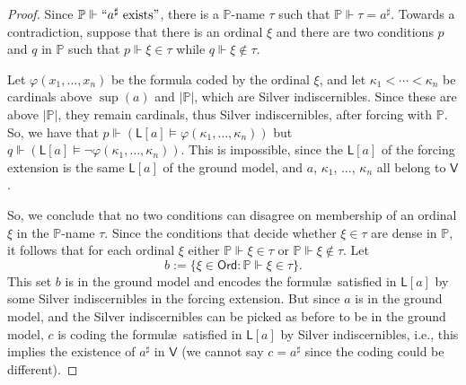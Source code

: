 \documentclass[10pt]{amsart}
\theoremstyle{definition}
\begin{document}
\begin{proof}
Since $\mathbb P\Vdash ``a^\sharp\ \text{exists}"$, there is a $\mathbb P$-name $\tau$ such that $\mathbb P\Vdash \tau=a^\sharp$. Towards a contradiction, suppose that there is an ordinal $\xi$ and there are two conditions $p$ and $q$ in $\mathbb P$ such that $p\Vdash \xi\in \tau$ while $q\Vdash \xi\not\in \tau$.\medskip

Let $\varphi(x_1,\ldots,x_n)$ be the formula coded by the ordinal $\xi$, and let $\kappa_1<\cdots<\kappa_n$ be cardinals above $\sup(a)$ and $|\mathbb P|$, which are Silver indiscernibles. Since these are above $|\mathbb P|$, they remain cardinals, thus Silver indiscernibles, after forcing with $\mathbb P$. So, we have that $p\Vdash (\mathsf L[a]\models \varphi(\kappa_1,\ldots,\kappa_n))$ but $q\Vdash(\mathsf L[a]\models \lnot\varphi(\kappa_1,\ldots,\kappa_n))$. This is impossible, since the $\mathsf L[a]$ of the forcing extension is the same $\mathsf L[a]$ of the ground model, and $a$, $\kappa_1$, $\ldots$, $\kappa_n$ all belong to $\mathsf V$.\medskip

So, we conclude that no two conditions can disagree on membership of an ordinal $\xi$ in the $\mathbb P$-name $\tau$. Since the conditions that decide whether $\xi\in \tau$ are dense in $\mathbb P$, it follows that for each ordinal $\xi$ either $\mathbb P\Vdash \xi\in \tau$ or $\mathbb P\Vdash \xi\not\in\tau$. Let
\[b:=\{\xi\in\mathsf{Ord}: \mathbb P\Vdash \xi\in\tau\}.\]
This set $b$ is in the ground model and encodes the formul\ae\ satisfied in $\mathsf L[a]$ by some Silver indiscernibles in the forcing extension. But since $a$ is in the ground model, and the Silver indiscernibles can be picked as before to be in the ground model, $c$ is coding the formul\ae\ satisfied in $\mathsf L[a]$ by Silver indiscernibles, i.e., this implies the existence of $a^\sharp$ in $\mathsf V$ (we cannot say $c=a^\sharp$ since the coding could be different).
\end{proof}
\end{document}
